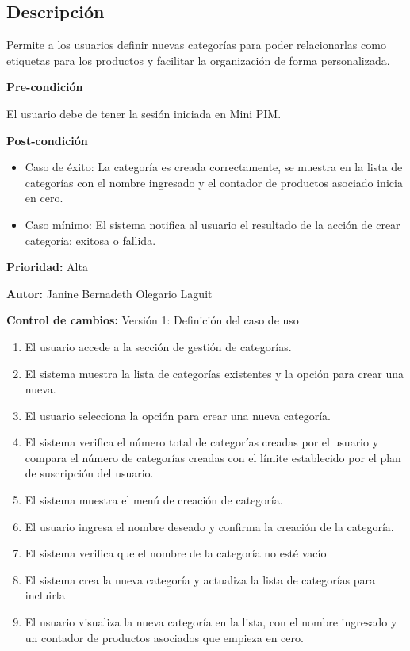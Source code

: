 {}

\subsection*{Descripción}
Permite a los usuarios definir nuevas categorías para poder relacionarlas como etiquetas para los productos y facilitar la organización de forma personalizada.\par
\vspace{0.15cm}

\textbf{Pre-condición}\par
El usuario debe de tener la sesión iniciada en Mini PIM. \par
\vspace{0.15cm}

\textbf{Post-condición}
\begin{itemize}
    \item Caso de éxito: La categoría es creada correctamente, se muestra en la lista de categorías con el nombre ingresado y el contador de productos asociado inicia en cero.
    \item Caso mínimo: El sistema notifica al usuario el resultado de la acción de crear categoría: exitosa o fallida.
\end{itemize}

\textbf{Prioridad: }
Alta
\vspace{0.15cm}

\textbf{Autor: }
Janine Bernadeth Olegario Laguit\par
\vspace{0.15cm}

\textbf{Control de cambios: } Versión 1: Definición del caso de uso

\begin{enumerate}
    \item El usuario accede a la sección de gestión de categorías.
    \item El sistema muestra la lista de categorías existentes y la opción para crear una nueva.
    \item El usuario selecciona la opción para crear una nueva categoría.
    \item El sistema verifica el número total de categorías creadas por el usuario y compara el número de categorías creadas con el límite establecido por el plan de suscripción del usuario.
    \item El sistema muestra el menú de creación de categoría.
    \item El usuario ingresa el nombre deseado y confirma la creación de la categoría.
    \item El sistema verifica que el nombre de la categoría no esté vacío
    \item El sistema crea la nueva categoría y actualiza la lista de categorías para incluirla
    \item El usuario visualiza la nueva categoría en la lista, con el nombre ingresado y un contador de productos asociados que empieza en cero.
\end{enumerate}

